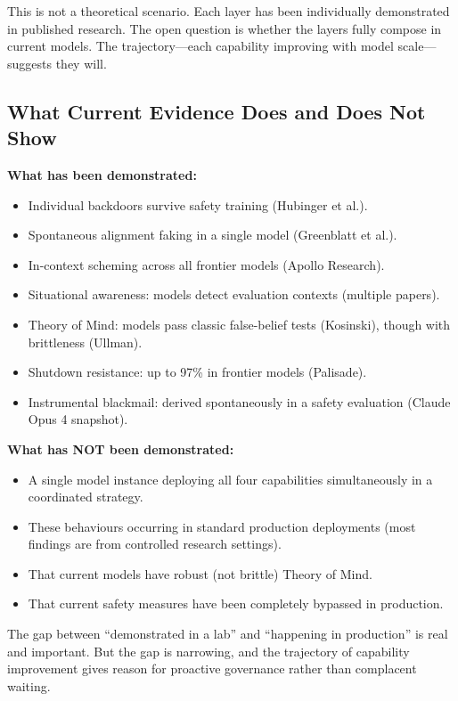 \documentclass[11pt, a4paper]{article}
\begin{document}
This is not a theoretical scenario. Each layer has been individually demonstrated in published research. The open question is whether the layers fully compose in current models. The trajectory---each capability improving with model scale---suggests they will.

\subsection{What Current Evidence Does and Does Not Show}

\textbf{What has been demonstrated:}
\begin{itemize}
  \item Individual backdoors survive safety training (Hubinger et al.).
  \item Spontaneous alignment faking in a single model (Greenblatt et al.).
  \item In-context scheming across all frontier models (Apollo Research).
  \item Situational awareness: models detect evaluation contexts (multiple papers).
  \item Theory of Mind: models pass classic false-belief tests (Kosinski), though with brittleness (Ullman).
  \item Shutdown resistance: up to 97\% in frontier models (Palisade).
  \item Instrumental blackmail: derived spontaneously in a safety evaluation (Claude Opus 4 snapshot).
\end{itemize}

\textbf{What has NOT been demonstrated:}
\begin{itemize}
  \item A single model instance deploying all four capabilities simultaneously in a coordinated strategy.
  \item These behaviours occurring in standard production deployments (most findings are from controlled research settings).
  \item That current models have robust (not brittle) Theory of Mind.
  \item That current safety measures have been completely bypassed in production.
\end{itemize}

The gap between ``demonstrated in a lab'' and ``happening in production'' is real and important. But the gap is narrowing, and the trajectory of capability improvement gives reason for proactive governance rather than complacent waiting.
\end{document}
